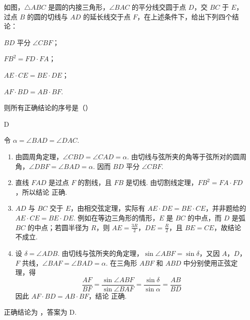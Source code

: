 \begin{problem}
如图，\(\triangle ABC\) 是圆的内接三角形，\(\angle BAC\) 的平分线交圆于点 \(D\)，交 \(BC\) 于 \(E\)，过点 \(B\) 的圆的切线与 \(AD\) 的延长线交于点 \(F\)，在上述条件下，给出下列四个结论：


\begin{circlelist}
\item \(BD\) 平分 \(\angle CBF\)；
\item \(FB^{2} = FD \cdot FA\)；
\item \(AE \cdot CE = BE \cdot DE\)；
\item \(AF \cdot BD = AB \cdot BF\).
\end{circlelist}

则所有正确结论的序号是（\quad）

\choices
    {}
    {}
    {}
    {}
\end{problem}

\begin{answer}
D
\end{answer}

\begin{solution}
令 \(\alpha=\angle BAD=\angle DAC\).

\begin{enumerate}
\item 由圆周角定理，\(\angle CBD=\angle CAD=\alpha\). 由切线与弦所夹的角等于弦所对的圆周角，\(\angle DBF=\angle BAD=\alpha\). 因而 \(BD\) 平分 \(\angle CBF\).
\item 直线 \(FAD\) 是过点 \(F\) 的割线，且 \(FB\) 是切线. 由切割线定理，\(FB^2=FA\cdot FD\)，所以结论  正确.
\item \(AD\) 与 \(BC\) 交于 \(E\)，由相交弦定理，实际有 \(AE\cdot DE=BE\cdot CE\)，并非题给的 \(AE\cdot CE=BE\cdot DE\). 例如在等边三角形的情形，\(E\) 是 \(BC\) 的中点，而 \(D\) 是弧 \(BC\) 的中点；若圆半径为 \(R\)，则 \(AE=\frac{3R}{2}\)，\(DE=\frac R2\)，且 \(BE=CE\)，故结论  不成立.
\item 设 \(\delta=\angle ADB\). 由切线与弦所夹的角定理，\(\sin\angle ABF=\sin\delta\)，又因 \(A\)，\(D\)，\(F\) 共线，\(\angle BAF=\angle BAD=\alpha\). 在三角形 \(ABF\) 和 \(ABD\) 中分别使用正弦定理，得
\[
\frac{AF}{BF}=\frac{\sin\angle ABF}{\sin\angle BAF}=\frac{\sin\delta}{\sin\alpha}=\frac{AB}{BD}
\]
因此 \(AF\cdot BD=AB\cdot BF\)，结论  正确.
\end{enumerate}

正确结论为 ，答案为 D.
\end{solution}

